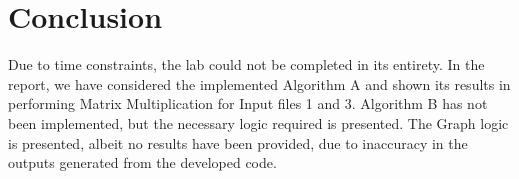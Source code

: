 \documentclass[journal, a4paper]{IEEEtran}
\begin{document}



\section{Conclusion}
Due to time constraints, the lab could not be completed in its entirety. In the report, we have considered the implemented Algorithm A and shown its results in performing Matrix Multiplication for Input files 1 and 3. Algorithm B has not been implemented, but the necessary logic required is presented. The Graph logic is presented, albeit no results have been provided, due to inaccuracy in the outputs generated from the developed code. 
\end{document}
